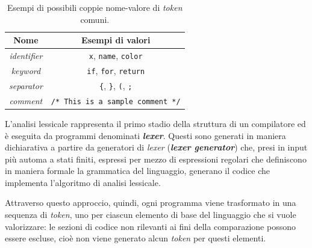 \begin{table}[h]
    \centering
    \begin{tabular}{|c|c|} 
        \hline
        \textbf{Nome} & \textbf{Esempi di valori} \\ [0.5ex] 
        \hline\hline
        \textit{identifier} & \texttt{x}, \texttt{name}, \texttt{color} \\ 
        \hline
        \textit{keyword} & \texttt{if}, \texttt{for}, \texttt{return} \\
        \hline
        \textit{separator} & \texttt{\{}, \texttt{\}}, \texttt{(}, \texttt{;} \\
        \hline
        \textit{comment} & \texttt{/* This is a sample comment */} \\
        \hline
    \end{tabular}
    \caption{Esempi di possibili coppie nome-valore di \textit{token} comuni.}
    \label{table:token-examples}
\end{table}

L'analisi lessicale rappresenta il primo stadio della struttura di un compilatore ed è eseguita da programmi denominati \textbf{\textit{lexer}}. 
%
Questi sono generati in maniera dichiarativa a partire da generatori di \textit{lexer} (\textbf{\textit{lexer generator}}) che, presi in input più automa a stati finiti, espressi per mezzo di espressioni regolari che definiscono in maniera formale la grammatica del linguaggio, generano il codice che implementa l'algoritmo di analisi lessicale. 

Attraverso questo approccio, quindi, ogni programma viene trasformato in una sequenza di \textit{token}, uno per ciascun elemento di base del linguaggio che si vuole valorizzare: le sezioni di codice non rilevanti ai fini della comparazione possono essere escluse, cioè non viene generato alcun \textit{token} per questi elementi.

% 

% 


